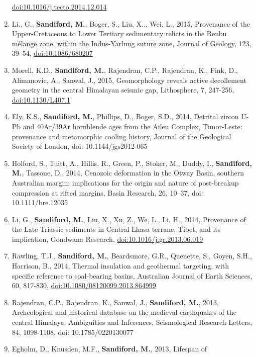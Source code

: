 \documentclass[
]{article}
\begin{document}
\begin{enumerate}
  \url{doi:10.1016/j.tecto.2014.12.014} 
\item
  Li., G., \textbf{Sandiford, M.}, Boger, S., Liu, X.., Wei, L., 2015,
  Provenance of the Upper-Cretaceous to Lower Tertiary sedimentary
  relicts in the Renbu mélange zone, within the Indus-Yarlung suture
  zone, Journal of Geology, 123, 39--54, \url{doi:10.1086/680207}
\item
  Morell, K.D., \textbf{Sandiford, M.}, Rajendran, C.P., Rajendran, K.,
  Fink, D., Alimanovic, A., Sanwal, J., 2015, Geomorphology reveals
  active decollement geometry in the central Himalayan seismic gap,
  Lithosphere, 7, 247-256, \url{doi:10.1130/L407.1}
\item
  Ely, K.S., \textbf{Sandiford, M.}, Phillips, D., Boger, S.D., 2014,
  Detrital zircon U-Pb and 40Ar/39Ar hornblende ages from the Aileu
  Complex, Timor-Leste: provenance and metamorphic cooling history,
  Journal of the Geological Society of London, doi: 10.1144/jgs2012-065
\item
  Holford, S., Tuitt, A., Hillis, R., Green, P., Stoker, M., Duddy, I.,
  \textbf{Sandiford, M.}, Tassone, D., 2014, Cenozoic deformation in the
  Otway Basin, southern Australian margin: implications for the origin
  and nature of post-breakup compression at rifted margins, Basin
  Research, 26, 10--37, doi: 10.1111/bre.12035
\item
  Li, G., \textbf{Sandiford, M.}, Liu, X., Xu, Z., We, L., Li. H., 2014,
  Provenance of the Late Triassic sediments in Central Lhasa terrane,
  Tibet, and its implication, Gondwana Research,
  \url{doi:10.1016/j.gr.2013.06.019} 
\item
  Rawling, T.J., \textbf{Sandiford, M.}, Beardsmore, G.R., Quenette, S.,
  Goyen, S.H., Harrison, B., 2014, Thermal insulation and geothermal
  targeting, with specific reference to coal-bearing basins, Australian
  Journal of Earth Sciences, 60, 817-830,
  \url{doi:10.1080/08120099.2013.864999} 
\item
  Rajendran, C.P., Rajendran, K., Sanwal, J., \textbf{Sandiford, M.},
  2013, Archeological and historical database on the medieval
  earthquakes of the central Himalaya: Ambiguities and Inferences,
  Seismological Research Letters, 84, 1098-1108, doi: 10.1785/0220130077
\item
  Egholm, D., Knusden, M.F., \textbf{Sandiford, M.}, 2013, Lifespan of

\end{enumerate}
\end{document}
